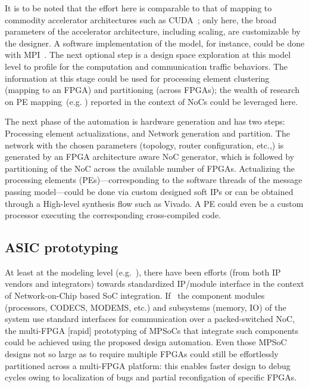 \documentclass[conference, 9pt]{IEEEtran}
\begin{document}
It is to be noted that the effort here is comparable to that of mapping to commodity accelerator architectures such as CUDA~\cite{CUDA:Programming-Guide}; only here, 
the broad parameters of the accelerator architecture, including scaling, are customizable by the designer. A software implementation of the model, for instance, could be done with  MPI~\cite{mpi-3.0}. The next optional step is a design 
space exploration at this model level to profile for the computation and communication traffic behaviors. The information at this stage could be used for processing element clustering (mapping to an FPGA) and partitioning (across FPGAs); 
the wealth of research on PE mapping~(e.g. \cite{1411933}) reported in the context of NoCs could be leveraged here. 

The next phase of the automation is hardware generation and has two steps: Processing element actualizations, and Network generation and partition. The network with the chosen parameters (topology, router configuration, etc.,) 
is generated by an FPGA architecture aware NoC generator,  which is followed by partitioning of the NoC across the available number of FPGAs. Actualizing the processing elements (PEs)---corresponding to the software threads 
of the message passing model---could be done via custom designed soft IPs or can be obtained through a High-level synthesis flow such as Vivado\cite{vivado}. A PE could even be a custom processor executing the corresponding cross-compiled code.

\subsection{ASIC prototyping}
At least at the modeling level (e.g.~\cite{ocpip}), there have been efforts (from both IP vendors and integrators) towards standardized IP/module interface in the context of Network-on-Chip based SoC integration. 
If~\cite{dally201321st} the component modules (processors, CODECS, MODEMS, etc.)  and subsystems (memory, IO) of the system use standard interfaces for communication over a packed-switched NoC, the 
multi-FPGA [rapid] prototyping of MPSoCs that integrate such components could be achieved using the proposed design automation. Even those MPSoC designs not so large as to require multiple FPGAs could still be effortlessly partitioned
across a multi-FPGA platform: this enables faster design to debug cycles owing to localization of bugs and partial reconfigation of specific FPGAs.
\end{document}
